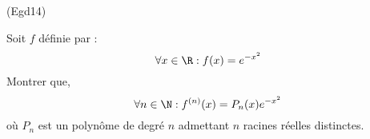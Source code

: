 \begin{tiny}(Egd14)\end{tiny}
Soit $f$ définie par :
\begin{displaymath}
 \forall x\in \R : f(x) = e^{-x^2}
\end{displaymath}
Montrer que,
\begin{displaymath}
 \forall n \in \N : f^{(n)}(x)=P_n(x)e^{-x^2}
\end{displaymath}
où $P_n$ est un polynôme de degré $n$ admettant $n$ racines réelles distinctes.